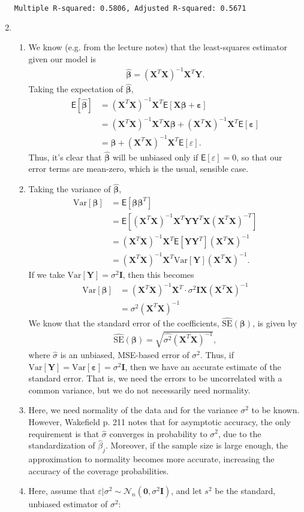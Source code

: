 \documentclass[11pt]{article}
\newcommand*\ba{\[ \begin{aligned}}
\newcommand*\ea{\end{aligned} \]}
\newcommand*\eps{\epsilon}
\newcommand*\E[1]{\mathsf{E}\left[#1\right]}
\newcommand*\Var[1]{\text{Var}\left[#1\right]}
\newcommand*\estim[1]{\widehat{#1}}
\newcommand*\bI{\mathbf{I}}
\newcommand*\bX{\mathbf{X}}
\newcommand*\bY{\mathbf{Y}}
\newcommand*\bzero{\mathbf{0}}
\newcommand*\bbeta{\boldsymbol{\beta}}
\newcommand*\beps{\boldsymbol{\varepsilon}}
\renewcommand\;{\,}
\renewcommand\epsilon{\varepsilon}
\begin{document}
\begin{enumerate}[label=(\alph*)]
\begin{lstlisting}[language=bash]
Multiple R-squared: 0.5806, Adjusted R-squared: 0.5671
\end{lstlisting}
\item
\begin{enumerate}[label=(\roman*)]
\item
We know (e.g. from the lecture notes) that the least-squares estimator given our model is
\ba
\estim{\bbeta} = (\bX^T \bX)^{-1} \bX^T \bY.
\ea
Taking the expectation of $\estim{\bbeta}$,
\ba
\E{\estim{\bbeta}} & = (\bX^T \bX)^{-1} \bX^T \E{ \bX \bbeta + \beps } \\
	& = (\bX^T \bX)^{-1} \bX^T \bX \bbeta + (\bX^T \bX)^{-1} \bX^T \E{\beps} \\
	& = \bbeta + (\bX^T \bX)^{-1} \bX^T \E{\eps}.
\ea
Thus, it's clear that $\estim{\bbeta}$ will be unbiased only if 
$\E{\eps} = 0$, so that our error terms are mean-zero, which is the usual, sensible case.
\item
Taking the variance of $\estim{\bbeta}$,
\ba
\Var{\bbeta} & = \E{ \bbeta \bbeta^T } \\
	& = \E{ (\bX^T \bX)^{-1} \bX^T \bY \bY^T \bX (\bX^T \bX)^{-T} } \\
	& = (\bX^T \bX)^{-1} \bX^T \E{ \bY \bY^T } (\bX^T \bX)^{-1} \\
	& = (\bX^T \bX)^{-1} \bX^T \Var{\bY} (\bX^T \bX)^{-1}.
\ea
If we take $\Var{\bY} = \sigma^2 \bI$, then this becomes
\ba
\Var{\bbeta} & = (\bX^T \bX)^{-1} \bX^T 
	\cdot \sigma^2 \bI \bX (\bX^T \bX)^{-1}  \\
	& = \sigma^2 (\bX^T \bX)^{-1} 
\ea
We know that the standard error of the coefficients, $\estim{\text{SE}}(\bbeta)$, is given by 
\ba
\estim{\text{SE}} (\bbeta) = \sqrt{\estim{\sigma^2} \left(\bX^T \bX \right)^{-1} },
\ea
where $\estim{\sigma}$ is an unbiased, MSE-based error of $\sigma^2$. Thus, if
$\Var{\bY} = \Var{\beps} = \sigma^2 \bI$, then we have an accurate estimate of the standard error. That is, we need the errors to be uncorrelated with a common variance, but we do not necessarily need normality.
\item
Here, we need normality of the data and for the variance $\sigma^2$ to be known. However, Wakefield p. 211 notes that for asymptotic accuracy, the only requirement is that $\estim{\sigma}$ converges in probability to $\sigma^2$, due to the standardization of $\estim{\beta}_j$. Moreover, if the sample size is large enough, 
the approximation to normality becomes more accurate, increasing the accuracy of the coverage probabilities.
\item
Here, assume that $\eps | \sigma^2 \sim \mathcal{N}_n(\bzero, \sigma^2 \bI)$, and let $s^2$ be the standard, unbiased estimator of $\sigma^2$:

\end{enumerate}
\end{enumerate}
\end{document}
